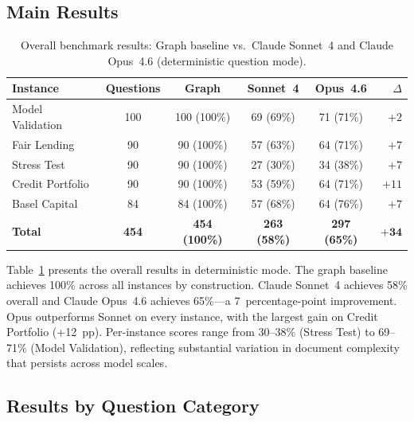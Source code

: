 \documentclass[11pt]{article}
\begin{document}
\subsection{Main Results}

\begin{table}[t]
\centering
\caption{Overall benchmark results: Graph baseline vs.\ Claude Sonnet~4
and Claude Opus~4.6 (deterministic question mode).}
\label{tab:main_results}
\small
\begin{tabular}{lccccr}
\toprule
Instance & Questions & Graph & Sonnet~4 & Opus~4.6 & $\Delta$ \\
\midrule
Model Validation & 100 & 100 (100\%) & 69 (69\%) & 71 (71\%) & $+2$ \\
Fair Lending & 90 & 90 (100\%) & 57 (63\%) & 64 (71\%) & $+7$ \\
Stress Test & 90 & 90 (100\%) & 27 (30\%) & 34 (38\%) & $+7$ \\
Credit Portfolio & 90 & 90 (100\%) & 53 (59\%) & 64 (71\%) & $+11$ \\
Basel Capital & 84 & 84 (100\%) & 57 (68\%) & 64 (76\%) & $+7$ \\
\midrule
\textbf{Total} & \textbf{454} & \textbf{454 (100\%)} & \textbf{263 (58\%)} & \textbf{297 (65\%)} & $\mathbf{+34}$ \\
\bottomrule
\end{tabular}
\end{table}

Table~\ref{tab:main_results} presents the overall results in
deterministic mode.  The graph baseline achieves 100\% across all
instances by construction.  Claude Sonnet~4 achieves 58\% overall
and Claude Opus~4.6 achieves 65\%---a 7~percentage-point improvement.
Opus outperforms Sonnet on every instance, with the largest gain on
Credit Portfolio (+12~pp).  Per-instance scores range from 30--38\%
(Stress Test) to 69--71\% (Model Validation), reflecting substantial
variation in document complexity that persists across model scales.

\subsection{Results by Question Category}
\end{document}
